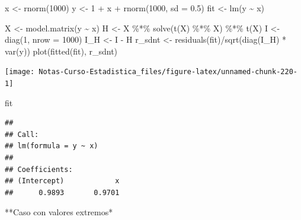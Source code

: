 \documentclass[
  12pt,
]{book}
\newenvironment{Shaded}{\begin{snugshade}}{\end{snugshade}}
\newcommand{\AttributeTok}[1]{\textcolor[rgb]{0.77,0.63,0.00}{#1}}
\newcommand{\DecValTok}[1]{\textcolor[rgb]{0.00,0.00,0.81}{#1}}
\newcommand{\FloatTok}[1]{\textcolor[rgb]{0.00,0.00,0.81}{#1}}
\newcommand{\FunctionTok}[1]{\textcolor[rgb]{0.00,0.00,0.00}{#1}}
\newcommand{\NormalTok}[1]{#1}
\newcommand{\OtherTok}[1]{\textcolor[rgb]{0.56,0.35,0.01}{#1}}
\newcommand{\SpecialCharTok}[1]{\textcolor[rgb]{0.00,0.00,0.00}{#1}}
\theoremstyle{definition}
\theoremstyle{definition}
\theoremstyle{definition}
\theoremstyle{remark}
\begin{document}
\begin{Shaded}
\begin{Highlighting}[]
\NormalTok{x }\OtherTok{\textless{}{-}} \FunctionTok{rnorm}\NormalTok{(}\DecValTok{1000}\NormalTok{)}
\NormalTok{y }\OtherTok{\textless{}{-}} \DecValTok{1} \SpecialCharTok{+}\NormalTok{ x }\SpecialCharTok{+} \FunctionTok{rnorm}\NormalTok{(}\DecValTok{1000}\NormalTok{, }\AttributeTok{sd =} \FloatTok{0.5}\NormalTok{)}
\NormalTok{fit }\OtherTok{\textless{}{-}} \FunctionTok{lm}\NormalTok{(y }\SpecialCharTok{\textasciitilde{}}\NormalTok{ x)}

\NormalTok{X }\OtherTok{\textless{}{-}} \FunctionTok{model.matrix}\NormalTok{(y }\SpecialCharTok{\textasciitilde{}}\NormalTok{ x)}
\NormalTok{H }\OtherTok{\textless{}{-}}\NormalTok{ X }\SpecialCharTok{\%*\%} \FunctionTok{solve}\NormalTok{(}\FunctionTok{t}\NormalTok{(X) }\SpecialCharTok{\%*\%}\NormalTok{ X) }\SpecialCharTok{\%*\%} \FunctionTok{t}\NormalTok{(X)}
\NormalTok{I }\OtherTok{\textless{}{-}} \FunctionTok{diag}\NormalTok{(}\DecValTok{1}\NormalTok{, }\AttributeTok{nrow =} \DecValTok{1000}\NormalTok{)}
\NormalTok{I\_H }\OtherTok{\textless{}{-}}\NormalTok{ I }\SpecialCharTok{{-}}\NormalTok{ H}
\NormalTok{r\_sdnt }\OtherTok{\textless{}{-}} \FunctionTok{residuals}\NormalTok{(fit)}\SpecialCharTok{/}\FunctionTok{sqrt}\NormalTok{(}\FunctionTok{diag}\NormalTok{(I\_H) }\SpecialCharTok{*} \FunctionTok{var}\NormalTok{(y))}
\FunctionTok{plot}\NormalTok{(}\FunctionTok{fitted}\NormalTok{(fit), r\_sdnt)}
\end{Highlighting}
\end{Shaded}

\begin{center}\texttt{[image: Notas-Curso-Estadistica\_files/figure-latex/unnamed-chunk-220-1]} \end{center}

\begin{Shaded}
\begin{Highlighting}[]
\NormalTok{fit}
\end{Highlighting}
\end{Shaded}

\begin{verbatim}
## 
## Call:
## lm(formula = y ~ x)
## 
## Coefficients:
## (Intercept)            x  
##      0.9893       0.9701
\end{verbatim}

**Caso con valores extremos*
\end{document}
